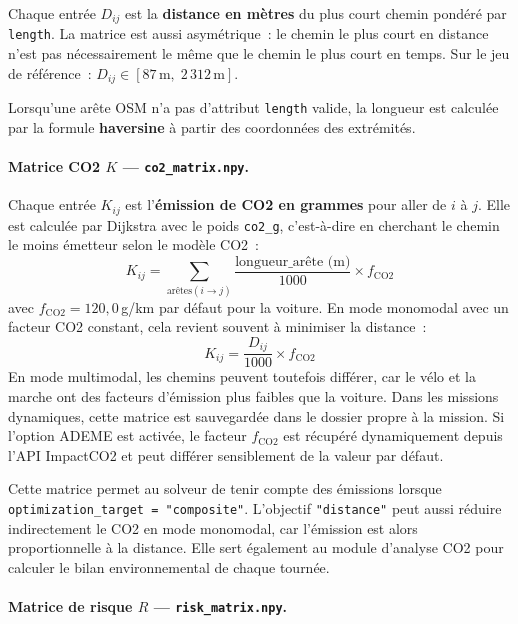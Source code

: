 \documentclass[a4paper, 12pt, twoside]{article}
\begin{document}
Chaque entr\'{e}e $D_{ij}$ est la \textbf{distance en m\`{e}tres} du plus court chemin
pond\'{e}r\'{e} par \texttt{length}. La matrice est aussi asym\'{e}trique~: le chemin le
plus court en distance n'est pas n\'{e}cessairement le m\^{e}me que le chemin le plus court
en temps. Sur le jeu de r\'{e}f\'{e}rence~: $D_{ij} \in [87\,\text{m},\; 2\,312\,\text{m}]$.

Lorsqu'une ar\^{e}te OSM n'a pas d'attribut \texttt{length} valide, la longueur est
calcul\'{e}e par la formule \textbf{haversine} \`{a} partir des coordonn\'{e}es des
extr\'{e}mit\'{e}s.

\paragraph{Matrice CO2 $K$ --- \texttt{co2\_matrix.npy}.}

Chaque entr\'{e}e $K_{ij}$ est l'\textbf{\'{e}mission de CO2 en grammes} pour aller de
$i$ \`{a} $j$. Elle est calcul\'{e}e par Dijkstra avec le poids \texttt{co2\_g},
c'est-\`{a}-dire en cherchant le chemin le moins \'{e}metteur selon le mod\`{e}le CO2~:
\[
  K_{ij} = \sum_{\text{ar\^{e}tes}(i \to j)} \frac{\text{longueur\_ar\^{e}te (m)}}{1000}
            \times f_{\text{CO2}}
\]
avec $f_{\text{CO2}} = 120{,}0$\,g/km par d\'{e}faut pour la voiture. En mode monomodal
avec un facteur CO2 constant, cela revient souvent \`{a} minimiser la distance~:
\[
  K_{ij} = \frac{D_{ij}}{1000} \times f_{\text{CO2}}
\]
En mode multimodal, les chemins peuvent toutefois diff\'{e}rer, car le v\'{e}lo et la
marche ont des facteurs d'\'{e}mission plus faibles que la voiture.
Dans les missions dynamiques, cette matrice est sauvegard\'{e}e dans le dossier propre
\`{a} la mission. Si l'option ADEME est activ\'{e}e, le facteur $f_{\text{CO2}}$ est
r\'{e}cup\'{e}r\'{e} dynamiquement depuis l'API ImpactCO2 et peut diff\'{e}rer
sensiblement de la valeur par d\'{e}faut.

Cette matrice permet au solveur de tenir compte des \'{e}missions lorsque
\texttt{optimization\_target = "composite"}. L'objectif \texttt{"distance"} peut aussi
r\'{e}duire indirectement le CO2 en mode monomodal, car l'\'{e}mission est alors
proportionnelle \`{a} la distance. Elle sert \'{e}galement au module d'analyse CO2 pour
calculer le bilan environnemental de chaque tourn\'{e}e.

\paragraph{Matrice de risque $R$ --- \texttt{risk\_matrix.npy}.}
\end{document}
